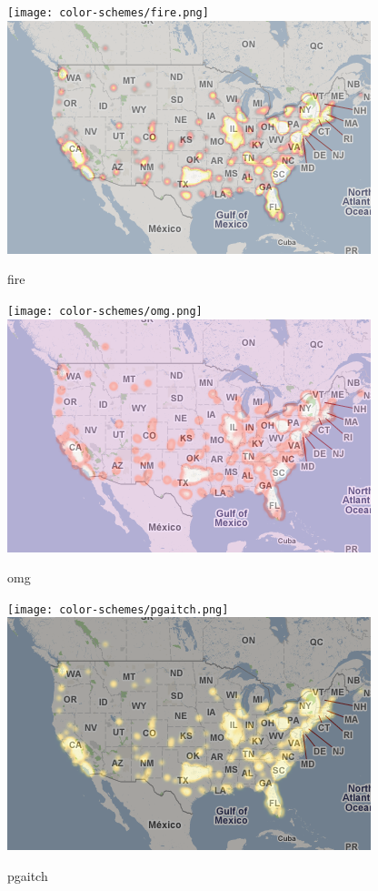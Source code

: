 \documentclass{manual}
\begin{document}
\begin{figure}[htp]
\texttt{[image: color-schemes/fire.png]}
\includegraphics[bb=0 0 400 256]{img/cs-fire.png}
\caption{fire}\label{fig:fire}
\end{figure}

\begin{figure}[htp]
\texttt{[image: color-schemes/omg.png]}
\includegraphics[bb=0 0 400 256]{img/cs-omg.png}
\caption{omg}\label{fig:omg}
\end{figure}

\begin{figure}[htp]
\texttt{[image: color-schemes/pgaitch.png]}
\includegraphics[bb=0 0 400 256]{img/cs-pgaitch.png}
\caption{pgaitch}\label{fig:pgaitch}
\end{figure}
\end{document}
